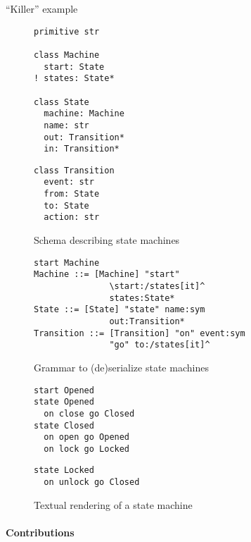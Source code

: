 \documentclass[preprint,10pt]{sigplanconf}
\begin{document}
``Killer'' example

\begin{figure}
\begin{minipage}[t]{0.5\linewidth}
\begin{lstlisting}[language=ensoschema]
primitive str

class Machine
  start: State
! states: State*

class State
  machine: Machine
  name: str
  out: Transition*
  in: Transition*
\end{lstlisting}
\end{minipage}
\begin{minipage}[t]{0.4\linewidth}
\begin{lstlisting}[language=ensoschema]
class Transition
  event: str
  from: State
  to: State
  action: str
\end{lstlisting}
\end{minipage}
\caption{Schema describing state machines}
\end{figure}

\begin{figure}
\begin{lstlisting}[language=ensogrammar]
start Machine
Machine ::= [Machine] "start" 
               \start:/states[it]^ 
               states:State*
State ::= [State] "state" name:sym 
               out:Transition*
Transition ::= [Transition] "on" event:sym 
               "go" to:/states[it]^
\end{lstlisting}
\caption{Grammar to (de)serialize state machines}
\end{figure}

\begin{figure}
\begin{minipage}[t]{0.5\linewidth}
\begin{lstlisting}[language=ensostm]
start Opened
state Opened
  on close go Closed
state Closed
  on open go Opened
  on lock go Locked
\end{lstlisting}
\end{minipage}
\begin{minipage}[t]{0.4\linewidth}
\begin{lstlisting}[language=ensostm]
state Locked
  on unlock go Closed
\end{lstlisting}
\end{minipage}
\caption{Textual rendering of a state machine}
\end{figure}

\paragraph{Contributions}
\end{document}
